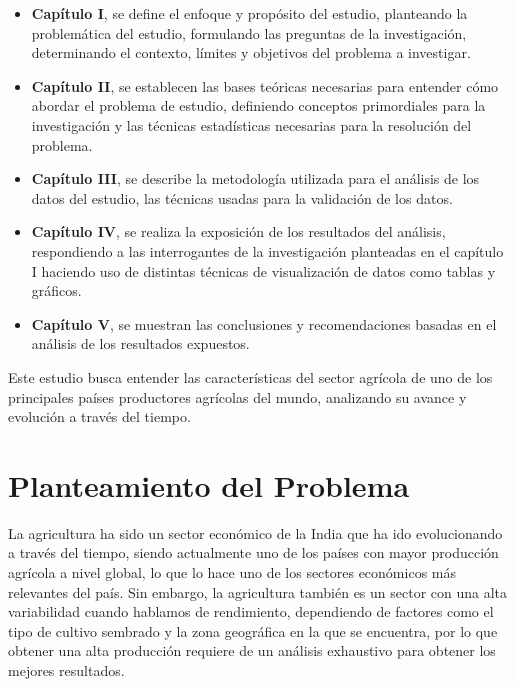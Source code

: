 \documentclass[oneside,11pt]{Latex/Classes/PhDthesisPSnPDF}
\begin{document}
\begin{itemize}

    \item \textbf{Capítulo I}, se define el enfoque y propósito del estudio, planteando la problemática del estudio, formulando las preguntas de la investigación, determinando el contexto, límites y objetivos del problema a investigar.
    
    \item \textbf{Capítulo II}, se establecen las bases teóricas necesarias para entender cómo abordar el problema de estudio, definiendo conceptos primordiales para la investigación y las técnicas estadísticas necesarias para la resolución del problema.
    
    \item \textbf{Capítulo III}, se describe la metodología utilizada para el análisis de los datos del estudio, las técnicas usadas para la validación de los datos.
    
    \item \textbf{Capítulo IV}, se realiza la exposición de los resultados del análisis, respondiendo a las interrogantes de la investigación planteadas en el capítulo I haciendo uso de distintas técnicas de visualización  de datos como tablas y gráficos.
    
    \item \textbf{Capítulo V}, se muestran las conclusiones y recomendaciones basadas en el análisis de los resultados expuestos.
    
\end{itemize}

Este estudio busca entender las características del sector agrícola de
uno de los principales países productores agrícolas del mundo,
analizando su avance y evolución a través del tiempo.

\chapter{Planteamiento del Problema}

La agricultura ha sido un sector económico de la India que ha ido
evolucionando a través del tiempo, siendo actualmente uno de los países
con mayor producción agrícola a nivel global, lo que lo hace uno de los
sectores económicos más relevantes del país. Sin embargo, la agricultura
también es un sector con una alta variabilidad cuando hablamos de
rendimiento, dependiendo de factores como el tipo de cultivo sembrado y
la zona geográfica en la que se encuentra, por lo que obtener una alta
producción requiere de un análisis exhaustivo para obtener los mejores
resultados.\\
\end{document}
